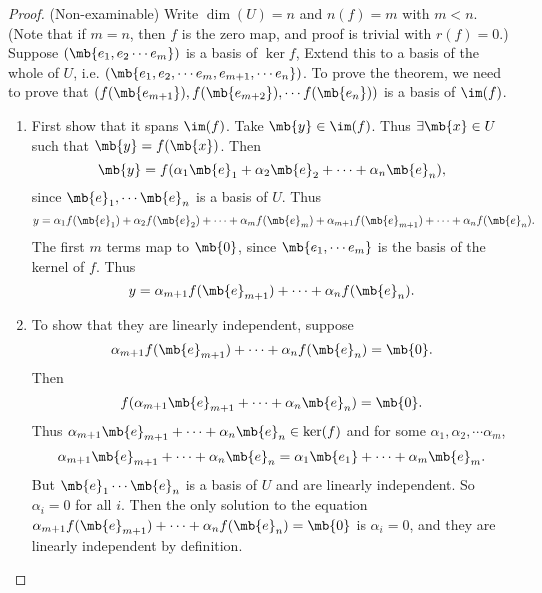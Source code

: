 \documentclass[a4paper]{article}
\begin{document}
\begin{proof}
  (Non-examinable) Write $\dim(U) = n$ and $n(f) = m$ with $m < n$. (Note that if $m = n$, then $f$ is the zero map, and proof is trivial with $r(f) = 0$.) Suppose $(\mb{e_1, e_2\cdots e_m})$ is a basis of $\ker f$, Extend this to a basis of the whole of $U$, i.e. $(\mb{e_1, e_2, \cdots e_m, e_{m+1}, \cdots e_n})$. To prove the theorem, we need to prove that $(f(\mb{e_{m+1}}), f(\mb{e_{m + 2}}), \cdots f({\mb{e_n}}))$ is a basis of $\im (f)$.
    \begin{enumerate}
      \item First show that it spans $\im (f)$. Take $\mb{y}\in \im(f)$. Thus $\exists \mb{x}\in U$ such that $\mb{y} = f(\mb{x})$. Then
        \[
        \mb{y} = f(\alpha_1\mb{e}_1 + \alpha_2\mb{e}_2 + \cdots + \alpha_n \mb{e}_n),
        \]
        since $\mb{e}_1, \cdots \mb{e}_n$ is a basis of $U$. Thus
        \[
        y = \alpha_1f(\mb{e}_1) + \alpha_2f(\mb{e}_2) + \cdots + \alpha_m f(\mb{e}_m) + \alpha_{m + 1}f(\mb{e}_{m + 1}) + \cdots + \alpha_nf(\mb{e}_n).
        \]
        The first $m$ terms map to $\mb{0}$, since $\mb{e_1, \cdots e_m}$ is the basis of the kernel of $f$. Thus
        \[
        y = \alpha_{m + 1} f(\mb{e}_{m + 1}) + \cdots + \alpha_n f(\mb{e}_n).
        \]
      \item To show that they are linearly independent, suppose
        \[
        \alpha_{m + 1} f(\mb{e}_{m + 1}) + \cdots + \alpha_n f(\mb{e}_n) = \mb{0}.
        \]
        Then 
        \[
        f(\alpha_{m + 1}\mb{e}_{m + 1} + \cdots + \alpha_n\mb{e}_n) = \mb{0}.
        \]
        Thus $\alpha_{m + 1}\mb{e}_{m + 1} + \cdots + \alpha_n\mb{e}_n\in \ker (f)$ and for some $\alpha_1, \alpha_2, \cdots \alpha_m$, 
        \[
        \alpha_{m + 1}\mb{e}_{m + 1} + \cdots + \alpha_n\mb{e}_n = \alpha_1\mb{e_1} + \cdots + \alpha_m\mb{e}_m.
        \]
        But $\mb{e}_1\cdots \mb{e}_n$ is a basis of $U$ and are linearly independent. So $\alpha_i = 0$ for all $i$. Then the only solution to the equation $\alpha_{m + 1} f(\mb{e}_{m + 1}) + \cdots + \alpha_n f(\mb{e}_n) = \mb{0}$ is $\alpha_i = 0$, and they are linearly independent by definition.
    \end{enumerate}
\end{proof}
\end{document}
